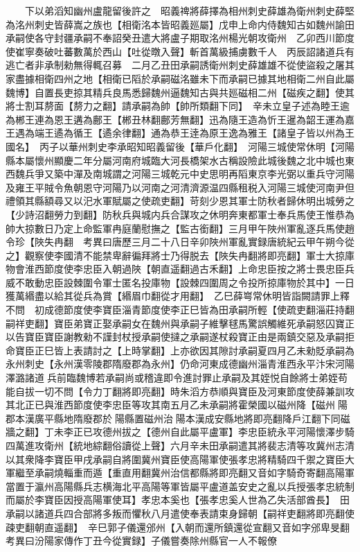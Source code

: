 　　下以弟滔知幽州盧龍留後許之　昭義禆將薛擇為相州刺史薛雄為衛州刺史薛堅為洺州刺史皆薛嵩之族也【相衛洺本皆昭義廵屬】戊申上命内侍魏知古如魏州諭田承嗣使各守封疆承嗣不奉詔癸丑遣大將盧子期取洺州楊光朝攻衛州　乙卯西川節度使崔寧奏破吐蕃數萬於西山【吐從暾入聲】斬首萬級捕虜數千人　丙辰詔諸道兵有逃亡者非承制勑無得輒召募　二月乙丑田承嗣誘衛州刺史薛雄雄不從使盜殺之屠其家盡據相衛四州之地【相衛已䧟於承嗣磁洺雖未下而承嗣已據其地相衛二州自此屬魏博】自置長吏掠其精兵良馬悉歸魏州逼魏知古與共廵磁相二州【磁疾之翻】使其將士割耳剺面【剺力之翻】請承嗣為帥【帥所類翻下同】　辛未立皇子述為睦王逾為郴王連為恩王遘為鄜王【郴丑林翻鄜芳無翻】迅為隨王造為忻王暹為韶王運為嘉王遇為端王遹為循王【遹余律翻】通為恭王逹為原王逸為雅王【諸皇子皆以州為王國名】　丙子以華州刺史李承昭知昭義留後【華戶化翻】　河陽三城使常休明【河陽縣本屬懷州顯慶二年分屬河南府城臨大河長橋架水古稱設險此城後魏之北中城也東西魏兵爭又築中潬及南城謂之河陽三城乾元中史思明再䧟東京李光弼以重兵守河陽及雍王平賊令魚朝恩守河陽乃以河南之河清濟源温四縣租税入河陽三城使河南尹但禮領其縣額尋又以汜水軍賦屬之使疏吏翻】苛刻少恩其軍士防秋者歸休明出城勞之【少詩沼翻勞力到翻】防秋兵與城内兵合謀攻之休明奔東都軍士奉兵馬使王惟恭為帥大掠數日乃定上命監軍冉庭蘭慰撫之【監古銜翻】三月甲午陜州軍亂逐兵馬使趙令珍【陜失冉翻　考異曰唐歷三月二十八日辛卯陜州軍亂實録唐統紀云甲午朔今從之】觀察使李國清不能禁卑辭徧拜將士乃得脱去【陜失冉翻將即亮翻】軍士大掠庫物會淮西節度使李忠臣入朝過陜【朝直遥翻過古禾翻】上命忠臣按之將士畏忠臣兵威不敢動忠臣設棘圍令軍士匿名投庫物【設棘四圍周之令投所掠庫物於其中】一日獲萬緡盡以給其從兵為賞【緡眉巾翻從才用翻】　乙巳薛㟧常休明皆詣闕請罪上釋不問　初成德節度使李寶臣淄青節度使李正巳皆為田承嗣所輕【使疏吏翻淄莊持翻嗣祥吏翻】寶臣弟寶正娶承嗣女在魏州與承嗣子維擊毬馬驚誤觸維死承嗣怒囚寶正以告寶臣寶臣謝教勑不謹封杖授承嗣使撻之承嗣遂杖殺寶正由是兩鎮交惡及承嗣拒命寶臣正巳皆上表請討之【上時掌翻】上亦欲因其隙討承嗣夏四月乙未勑貶承嗣為永州刺史【永州漢零陵郡隋廢郡為永州】仍命河東成德幽州淄青淮西永平汴宋河陽澤潞諸道兵前臨魏博若承嗣尚或稽違即令進討罪止承嗣及其姪悦自餘將士弟姪苟能自拔一切不問【令力丁翻將即亮翻】時朱滔方恭順與寶臣及河東節度使薛兼訓攻其北正已與淮西節度使李忠臣等攻其南五月乙未承嗣將霍榮國以磁州降【磁州陽郡本漢廣平縣地隋廢郡於陽縣置磁州治陽本漢成安縣地將即亮翻降戶江翻下同磁牆之翻】丁未李正已攻德州拔之【德州自此屬平盧軍】李忠臣統永平河陽懷澤步騎四萬進攻衛州【統地綜翻俗讀從上聲】六月辛未田承嗣遣其將裴志清等攻冀州志清以其衆降李寶臣甲戌承嗣自將圍冀州寶臣使高陽軍使張孝忠將精騎四千禦之寶臣大軍繼至承嗣燒輜重而遁【重直用翻冀州治信都縣將即亮翻又音如字騎奇寄翻高陽軍當置于瀛州高陽縣兵志横海北平高陽等軍皆屬平盧道盖安史之亂以兵授張孝忠統制而屬於李寶臣因授高陽軍使耳】孝忠本奚也【張孝忠奚人世為乙失活部酋長】　田承嗣以諸道兵四合部將多叛而懼秋八月遣使奉表請束身歸朝【嗣祥吏翻將即亮翻使疎吏翻朝直遥翻】　辛巳郭子儀還邠州【入朝而還所鎮還從宣翻又音如字邠卑旻翻考異曰汾陽家傳作丁丑今從實録】子儀嘗奏除州縣官一人不報僚


